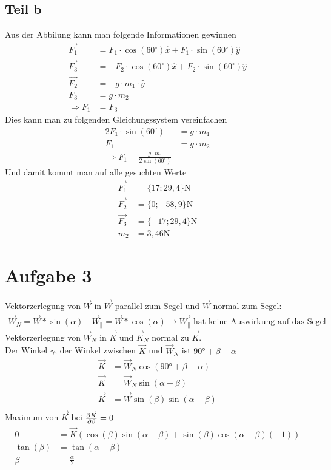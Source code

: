 \documentclass[a4paper,10pt]{extarticle}
\begin{document}
\subsection*{Teil b}
Aus der Abbilung kann man folgende Informationen gewinnen
\begin{align*}
  \vec{F_1} &= F_1\cdot\cos(60^{\circ})\hat{x} + F_1\cdot\sin(60^{\circ})\hat{y}\\
  \vec{F_3} &= -F_2\cdot\cos(60^{\circ})\hat{x} + F_2\cdot\sin(60^{\circ})\hat{y}\\
  \vec{F_2} &= -g\cdot m_1\cdot \hat{y}\\
  F_3       &= g \cdot m_2\\
  \Rightarrow F_1 &= F_3
\end{align*}
Dies kann man zu folgenden Gleichungssystem vereinfachen
\begin{align*}
  2F_1\cdot\sin(60^{\circ}) &= g\cdot m_1\\
  F_1 &= g \cdot m_2\\
  \Rightarrow F_1 = \frac{g \cdot m_1}{2\sin(60^{\circ})}
\end{align*}
Und damit kommt man auf alle gesuchten Werte
\begin{align*}
  \vec{F_1} &= \{17;29,4\}\mbox{N}\\
  \vec{F_2} &= \{0;-58,9\}\mbox{N}\\
  \vec{F_3} &= \{-17;29,4\}\mbox{N}\\
  m_2 &= 3,46 \mbox{N}
\end{align*}



  \section*{Aufgabe 3}
  Vektorzerlegung von $\vec{W}$ in $\vec{W}$ parallel zum Segel und $\vec{W}$ normal zum Segel:
  \begin{align*}
  \vec{W}_N = \vec{W}*\sin(\alpha) \quad \vec{W}_\parallel = \vec{W}*\cos(\alpha) \rightarrow \vec{W_\parallel} \mbox{ hat keine Auswirkung auf das Segel}
  \end{align*}
  Vektorzerlegung von $\vec{W}_N$ in $\vec{K}$ und $\vec{K}_N$ normal zu $\vec{K}$. \\
  Der Winkel $\gamma$, der Winkel zwischen $\vec{K}$ und $\vec{W}_N$ ist $\ang{90}+ \beta - \alpha$ \\
  \begin{align*}
  \vec{K}&=\vec{W}_N \cos({\ang{90} + \beta - \alpha}) \\
  \vec{K}&=\vec{W}_N \sin(\alpha - \beta) \\
  \vec{K}&=\vec{W} \sin(\beta) \sin(\alpha - \beta) \\
  \end{align*} 
  Maximum von $\vec{K}$ bei $\pdv{\vec{K}}{\beta}=0$
  \begin{align*}
  0 &= \vec{K}(\cos(\beta)\sin(\alpha - \beta) + \sin(\beta)\cos(\alpha - \beta)(-1)) \\
  \tan(\beta) &= \tan(\alpha - \beta) \\
  \beta &= \frac{\alpha}{2}
  \end{align*}
\end{document}
